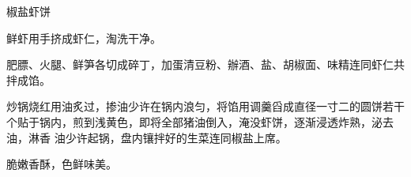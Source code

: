 \begin{recipe}{椒盐虾饼}

\ingredients


\preparation

\step 鲜虾用手挤成虾仁，淘洗干净。

\step 肥膘、火腿、鲜笋各切成碎丁，加蛋清豆粉、辦酒、盐、胡椒面、味精连同虾仁共
拌成馅。

\step 炒锅烧红用油炙过，掺油少许在锅内浪匀，将馅用调羹舀成直径一寸二的圆饼若干
个贴于锅内，煎到浅黄色，即将全部猪油倒入，淹没虾饼，逐渐浸透炸熟，泌去油，淋香
油少许起锅，盘内镶拌好的生菜连同椒盐上席。

\features

脆嫩香酥，色鲜味美。

\end{recipe}

